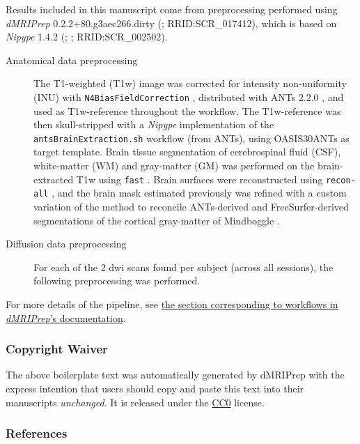 \documentclass[
]{article}
\author{}
\date{}
\begin{document}
Results included in this manuscript come from preprocessing performed
using \emph{dMRIPrep} 0.2.2+80.g3aec266.dirty (\citet{dmriprep};
RRID:SCR\_017412), which is based on \emph{Nipype} 1.4.2
(\citet{nipype1}; \citet{nipype2}; RRID:SCR\_002502).

\begin{description}
\item[Anatomical data preprocessing]
The T1-weighted (T1w) image was corrected for intensity non-uniformity
(INU) with \texttt{N4BiasFieldCorrection} \citep{n4}, distributed with
ANTs 2.2.0 \citep[RRID:SCR\_004757]{ants}, and used as T1w-reference
throughout the workflow. The T1w-reference was then skull-stripped with
a \emph{Nipype} implementation of the \texttt{antsBrainExtraction.sh}
workflow (from ANTs), using OASIS30ANTs as target template. Brain tissue
segmentation of cerebrospinal fluid (CSF), white-matter (WM) and
gray-matter (GM) was performed on the brain-extracted T1w using
\texttt{fast} \citep[FSL 5.0.9, RRID:SCR\_002823,][]{fsl_fast}. Brain
surfaces were reconstructed using \texttt{recon-all} \citep[FreeSurfer
6.0.1, RRID:SCR\_001847,][]{fs_reconall}, and the brain mask estimated
previously was refined with a custom variation of the method to
reconcile ANTs-derived and FreeSurfer-derived segmentations of the
cortical gray-matter of Mindboggle
\citep[RRID:SCR\_002438,][]{mindboggle}.
\item[Diffusion data preprocessing]
For each of the 2 dwi scans found per subject (across all sessions), the
following preprocessing was performed.
\end{description}

For more details of the pipeline, see
\href{https://nipreps.github.io/dmriprep/master/workflows.html}{the
section corresponding to workflows in \emph{dMRIPrep}'s documentation}.

\hypertarget{copyright-waiver}{%
\subsubsection{Copyright Waiver}\label{copyright-waiver}}

The above boilerplate text was automatically generated by dMRIPrep with
the express intention that users should copy and paste this text into
their manuscripts \emph{unchanged}. It is released under the
\href{https://creativecommons.org/publicdomain/zero/1.0/}{CC0} license.

\hypertarget{references}{%
\subsubsection{References}\label{references}}

  
\end{document}
